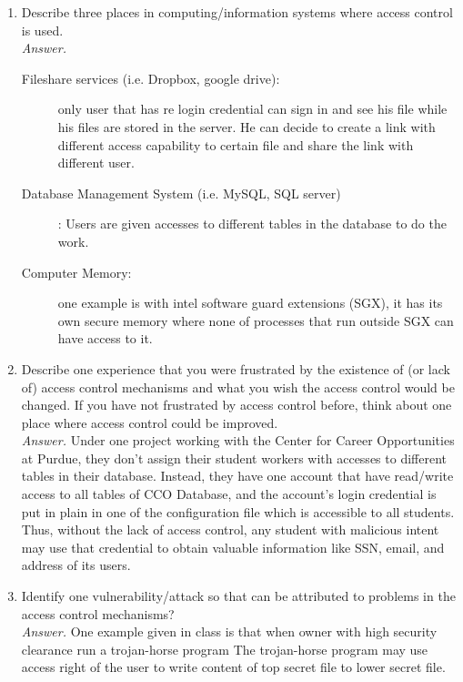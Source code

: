 \documentclass[11pt]{article}
\begin{document}
\begin{description}
\begin{enumerate}
 \item
Describe three places in computing/information systems where access
control is used.
\\
\textit{Answer. }
\begin{description}
	\item[Fileshare services (i.e. Dropbox, google drive):] only user that has re login credential can sign in and see his file while his files are stored in the server. He can decide to create a link with different access capability to certain file and share the link with different user. 
	\item[Database Management System (i.e. MySQL, SQL server)]: Users are given accesses to different tables in the database to do the work.
	\item[Computer Memory:] one example is with intel software guard extensions (SGX), it has its own secure memory where none of processes that run outside SGX can have access to it.
\end{description}
 \item
Describe one experience that you were frustrated by the existence of (or lack of) access control 
mechanisms and what you wish the access control would be changed.  If you have not frustrated by 
access control before, think about one place where access control could be improved.
\\
\textit{Answer.} Under one project working with the Center for Career Opportunities at Purdue, they don't assign their student workers with accesses to different tables in their database. Instead, they have one account that have read/write access to all tables of CCO Database, and the account's login credential is put in plain in one of the configuration file which is accessible to all students. Thus, without the lack of access control, any student with malicious intent may use that credential to obtain valuable information like SSN, email, and address of its users.
 \item
Identify one vulnerability/attack so that can be attributed to problems
in the access control mechanisms?
\\
\textit{Answer. } One example given in class is that when owner with high security clearance run a trojan-horse program The trojan-horse program may use access right of the user to write content of top secret file to lower secret file.  
\end{enumerate}




\end{description}
\end{document}

